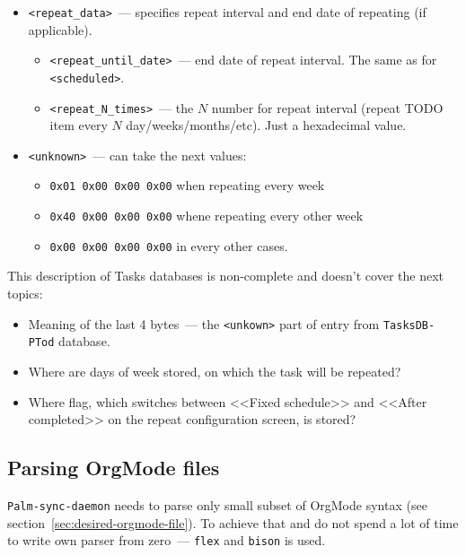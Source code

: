 \documentclass[a4paper,12pt,oneside]{scrartcl}
\begin{document}
\begin{itemize}
\begin{itemize}
  \item \texttt{<repeat\_data>}~--- specifies repeat interval and end date of
    repeating (if applicable).
    \begin{itemize}
    \item \texttt{<repeat\_until\_date>}~--- end date of repeat interval. The
      same as for \texttt{<scheduled>}.
    \item \texttt{<repeat\_N\_times>}~--- the $N$ number for repeat interval
      (repeat TODO item every $N$ day/weeks/months/etc). Just a hexadecimal
      value.
    \end{itemize}

  \item \texttt{<unknown>}~--- can take the next values:
    \begin{itemize}
    \item \texttt{0x01 0x00 0x00 0x00} when repeating every week
    \item \texttt{0x40 0x00 0x00 0x00} whene repeating every other week
    \item \texttt{0x00 0x00 0x00 0x00} in every other cases.
    \end{itemize}
  \end{itemize}
\end{itemize}

\newline
This description of Tasks databases is non-complete and doesn't cover the next
topics:
\begin{itemize}
\item Meaning of the last 4 bytes~--- the \texttt{<unkown>} part of entry from
  \texttt{TasksDB-PTod} database.
\item Where are days of week stored, on which the task will be repeated?
\item Where flag, which switches between <<Fixed schedule>> and <<After
  completed>> on the repeat configuration screen, is stored?
\end{itemize}

\subsection{Parsing OrgMode files}
\label{sec:pars-orgm-files}

\texttt{Palm-sync-daemon} needs to parse only small subset of OrgMode syntax
(see section~\ref{sec:desired-orgmode-file}). To achieve that and do not spend a
lot of time to write own parser from zero~--- \texttt{flex} and \texttt{bison}
is used.
\end{document}
